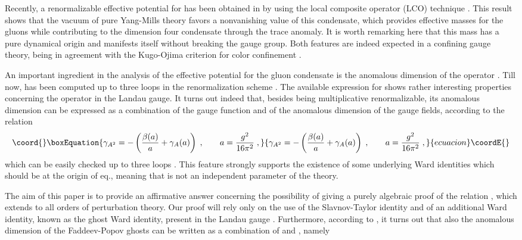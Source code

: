\documentclass[a4paper,12pt]{article}
\begin{document}
Recently, a renormalizable effective potential for \coordHE{} has been obtained in \cite{v} by using the
local composite operator (LCO) technique \cite{v1}. This result shows that
the vacuum of pure Yang-Mills theory favors a nonvanishing value of this
condensate, which provides effective masses for the gluons while
contributing to the dimension four condensate \coordHE{} through the trace anomaly. It is worth remarking here
that this mass has a pure dynamical origin and manifests itself without
breaking the gauge group. Both features are indeed expected in a confining
gauge theory, being in agreement with the Kugo-Ojima criterion for color
confinement \cite{ko}.

An important ingredient in the analysis of the effective potential for the
gluon condensate is the anomalous dimension \coordHE{} of the
operator \coordHE{}. Till now, \coordHE{} has been
computed up to three loops in the \coordHE{} renormalization scheme 
\cite{gr}. The available expression for \coordHE{} shows rather
interesting properties concerning the operator \coordHE{}in
the Landau gauge. It turns out indeed that, besides being multiplicative
renormalizable, its anomalous dimension can be expressed as a combination of
the gauge \myHighlight{$\beta $}\coordHE{} function and of the anomalous dimension \coordHE{} of
the gauge fields, according to the relation 
\begin{equation}\coord{}\boxEquation{
\gamma _{A^{2}}=-\left( \frac{\beta (a)}{a}+\gamma _{A}(a)\right)
\;,\;\;\;\;\;\;\;a=\frac{g^{2}}{16\pi ^{2}}\;,  \label{ri}
}{
\gamma _{A^{2}}=-\left( \frac{\beta (a)}{a}+\gamma _{A}(a)\right)
\;,\;\;\;\;\;\;\;a=\frac{g^{2}}{16\pi ^{2}}\;,  }{ecuacion}\coordE{}\end{equation}
which can be easily checked up to three loops \cite{gr}. This feature
strongly supports the existence of some underlying Ward identities which
should be at the origin of eq.\myHighlight{$\left( \ref{ri}\right) $}\coordHE{}, meaning that \coordHE{} is not an independent parameter of the theory.

The aim of this paper is to provide an affirmative answer concerning the
possibility of giving a purely algebraic proof of the relation \myHighlight{$\left( \ref
{ri}\right) $}\coordHE{}, which extends to all orders of perturbation theory. Our proof
will rely only on the use of the Slavnov-Taylor identity and of an
additional Ward identity, known as the ghost Ward identity, present in the
Landau gauge \cite{bps}. Furthermore, according to \cite{bps}, it turns out
that also the anomalous dimension \coordHE{} of the Faddeev-Popov ghosts
can be written as a combination of \myHighlight{$\beta $}\coordHE{} and \coordHE{}, namely
\end{document}
